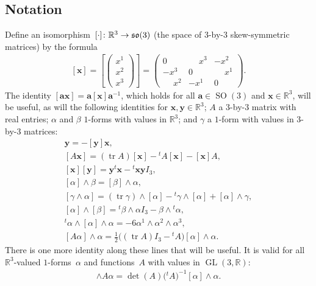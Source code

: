 \documentclass[11pt]{article}
\numberwithin{equation}{section}
\newcommand{\GL}{\operatorname{GL}}
\newcommand{\SO}{\operatorname{SO}}
\newcommand{\euso}{\operatorname{\frak{so}}}
\newcommand{\mba}{\mathbf{a}}
\newcommand{\mbx}{\mathbf{x}}
\newcommand{\mby}{\mathbf{y}}
\DeclareMathOperator{\tr}{tr}
\newcommand{\phm}{\phantom{-}}
\begin{document}
\subsection{Notation}
Define an isomorphism~$[{\cdot}]\colon \mathbb{R}^3\to\euso(3)$
(the space of $3$-by-$3$ skew-symmetric matrices) by the formula
\begin{gather*}%
\left[ \mbx \right]
= \left[\begin{pmatrix}x^1\\x^2\\x^3\end{pmatrix}\right]
= \begin{pmatrix}
 0 & \phm x^3 & -x^2\\
 -x^3 & 0 & \phm x^1\\
 \phm x^2 & -x^1 & 0
 \end{pmatrix}.
\end{gather*}
The identity $[\mba \mbx] = \mba[\mbx]\mba^{-1}$,
which holds for all $\mba\in\SO(3)$ and $\mbx\in\mathbb{R}^3$,
will be useful, as will the following identities
for $\mbx, \mby\in\mathbb{R}^3$;
$A$ a $3$-by-$3$ matrix with real entries;
$\alpha$ and $\beta$ $1$-forms with values in $\mathbb{R}^3$;
and $\gamma$ a $1$-form with values in $3$-by-$3$ matrices:
\begin{gather}
 [\mbx] \mby = - [\mby] \mbx,\nonumber\\
[A\mbx] = (\tr A) [\mbx] - {}^t\!A [\mbx] - [\mbx] A,\nonumber\\
[\mbx][\mby] = \mby {}^t\mbx - {}^t\mbx \mby I_3,\nonumber\\
[\alpha ]\wedge\beta = [\beta]\wedge\alpha,\nonumber\\
[\gamma\wedge\alpha] = (\tr\gamma)\wedge[\alpha]-{}^t\gamma\wedge[\alpha]+[\alpha]\wedge\gamma,\nonumber\\
[\alpha]\wedge [\beta] = {}^t\beta\wedge\alpha I_3 - \beta\wedge {}^t\alpha,\nonumber\\
{}^t\alpha\wedge[\alpha]\wedge\alpha = - 6 \alpha^1\wedge\alpha^2\wedge\alpha^3,\nonumber\\
[A \alpha]\wedge\alpha = \tfrac12\bigl((\tr A) I_3 - {}^t\!A\bigr) [\alpha]\wedge\alpha.\label{eq: crossproductidentities}
\end{gather}
There is one more identity along these lines that will be useful. It is valid for all $\mathbb{R}^3$-valued $1$-forms~$\alpha$ and functions~$A$ with values in $\GL(3,\mathbb{R})$:
\begin{gather*}
[A\alpha]\wedge A\alpha = \det(A) \big({}^t\!A\big)^{-1} [\alpha]\wedge\alpha.
\end{gather*}
\end{document}
